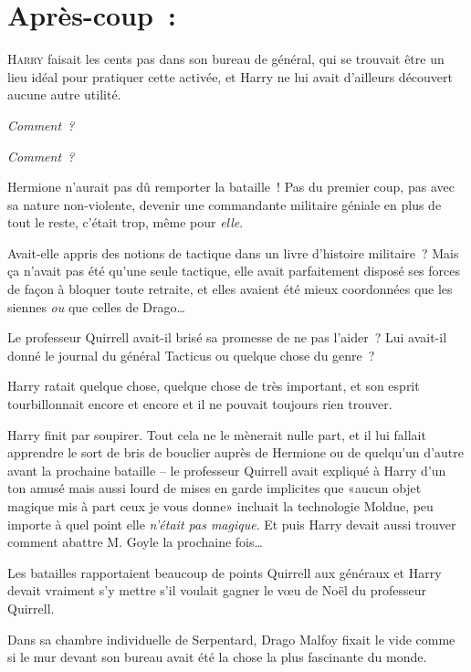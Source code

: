 
\section{Après-coup~:}

\lettrine{H}{arry} faisait les cents pas dans son bureau de général, qui se trouvait être un lieu idéal pour pratiquer cette activée, et Harry ne lui avait d'ailleurs découvert aucune autre utilité.

\emph{Comment~?}

\emph{Comment~?}

Hermione n'aurait pas dû remporter la bataille~! Pas du premier coup, pas avec sa nature non-violente, devenir une commandante militaire géniale en plus de tout le reste, c'était trop, même pour \emph{elle}.

Avait-elle appris des notions de tactique dans un livre d'histoire militaire~? Mais ça n'avait pas été qu'une seule tactique, elle avait parfaitement disposé ses forces de façon à bloquer toute retraite, et elles avaient été mieux coordonnées que les siennes \emph{ou} que celles de Drago…

Le professeur Quirrell avait-il brisé sa promesse de ne pas l'aider~? Lui avait-il donné le journal du général Tacticus ou quelque chose du genre~?

Harry ratait quelque chose, quelque chose de très important, et son esprit tourbillonnait encore et encore et il ne pouvait toujours rien trouver.

Harry finit par soupirer. Tout cela ne le mènerait nulle part, et il lui fallait apprendre le sort de bris de bouclier auprès de Hermione ou de quelqu'un d'autre avant la prochaine bataille -- le professeur Quirrell avait expliqué à Harry d'un ton amusé mais aussi lourd de mises en garde implicites que «aucun objet magique mis à part ceux je vous donne» incluait la technologie Moldue, peu importe à quel point elle \emph{n'était pas magique}. Et puis Harry devait aussi trouver comment abattre M. Goyle la prochaine fois…

Les batailles rapportaient beaucoup de points Quirrell aux généraux et Harry devait vraiment s'y mettre s'il voulait gagner le vœu de Noël du professeur Quirrell.

\later

Dans sa chambre individuelle de Serpentard, Drago Malfoy fixait le vide comme si le mur devant son bureau avait été la chose la plus fascinante du monde.

